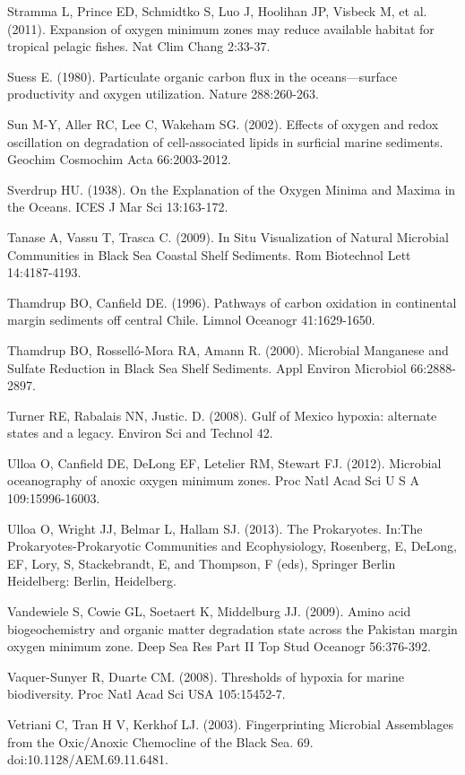 Stramma L, Prince ED, Schmidtko S, Luo J, Hoolihan JP, Visbeck M, et al. (2011). Expansion of oxygen minimum zones may reduce available habitat for tropical pelagic fishes. Nat Clim Chang 2:33-37.

Suess E. (1980). Particulate organic carbon flux in the oceans—surface productivity and oxygen utilization. Nature 288:260-263.

Sun M-Y, Aller RC, Lee C, Wakeham SG. (2002). Effects of oxygen and redox oscillation on degradation of cell-associated lipids in surficial marine sediments. Geochim Cosmochim Acta 66:2003-2012.

Sverdrup HU. (1938). On the Explanation of the Oxygen Minima and Maxima in the Oceans. ICES J Mar Sci 13:163-172.

Tanase A, Vassu T, Trasca C. (2009). In Situ Visualization of Natural Microbial Communities in Black Sea Coastal Shelf Sediments. Rom Biotechnol Lett 14:4187-4193.

Thamdrup BO, Canfield DE. (1996). Pathways of carbon oxidation in continental margin sediments off central Chile. Limnol Oceanogr 41:1629-1650.

Thamdrup BO, Rosselló-Mora RA, Amann R. (2000). Microbial Manganese and Sulfate Reduction in Black Sea Shelf Sediments. Appl Environ Microbiol 66:2888-2897.

Turner RE, Rabalais NN, Justic. D. (2008). Gulf of Mexico hypoxia: alternate states and a legacy. Environ Sci and Technol 42.

Ulloa O, Canfield DE, DeLong EF, Letelier RM, Stewart FJ. (2012). Microbial oceanography of anoxic oxygen minimum zones. Proc Natl Acad Sci U S A 109:15996-16003.

Ulloa O, Wright JJ, Belmar L, Hallam SJ. (2013). The Prokaryotes. In:The Prokaryotes-Prokaryotic Communities and Ecophysiology, Rosenberg, E, DeLong, EF, Lory, S, Stackebrandt, E, and Thompson, F (eds), Springer Berlin Heidelberg: Berlin, Heidelberg. 

Vandewiele S, Cowie GL, Soetaert K, Middelburg JJ. (2009). Amino acid biogeochemistry and organic matter degradation state across the Pakistan margin oxygen minimum zone. Deep Sea Res Part II Top Stud Oceanogr 56:376-392.

Vaquer-Sunyer R, Duarte CM. (2008). Thresholds of hypoxia for marine biodiversity. Proc Natl Acad Sci USA 105:15452-7.

Vetriani C, Tran H V, Kerkhof LJ. (2003). Fingerprinting Microbial Assemblages from the Oxic/Anoxic Chemocline of the Black Sea. 69. doi:10.1128/AEM.69.11.6481.

